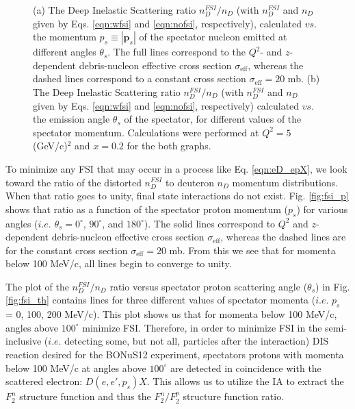 \begin{figure}
\begin{subfigure}[b]{0.4\linewidth}
	\end{subfigure}
	\caption[(a) The Deep Inelastic Scattering ratio $n_{D}^{FSI}/n_D$ calculated $vs.$ the momentum $p_s$ of the spectator nucleon emitted at different angles $\theta_s$. (b) The Deep Inelastic Scattering ratio $n_{D}^{FSI}/n_D$ calculated $vs.$ the emission angle $\theta_s$ of the spectator for different values of the spectator momentum.]{(a) The Deep Inelastic Scattering ratio $n_{D}^{FSI}/n_D$ (with $n_{D}^{FSI}$ and $n_D$ given by Eqs. \ref{eqn:wfsi} and \ref{eqn:nofsi}, respectively), calculated $vs.$ the momentum $p_s \equiv |\mathbf{p}_s|$ of the spectator nucleon emitted at different angles $\theta_s$. The full lines correspond to the $Q^2$- and $z$-dependent debris-nucleon effective cross section $\sigma_{\mathrm{eff}}$, whereas the dashed lines correspond to a constant cross section $\sigma_{\mathrm{eff}} = 20$ mb. (b) The Deep Inelastic Scattering ratio $n_{D}^{FSI}/n_D$ (with $n_{D}^{FSI}$ and $n_D$ given by Eqs. \ref{eqn:wfsi} and \ref{eqn:nofsi}, respectively) calculated $vs.$ the emission angle $\theta_s$ of the spectator, for different values of the spectator momentum. Calculations were performed at $Q^2 = 5$ (GeV/c)$^2$ and $x = 0.2$ for the both graphs.}
	\label{fig:fsi}
\end{figure}

To minimize any FSI that may occur in a process like Eq. \ref{eqn:eD_epX}, we look toward the ratio of the distorted $n_{D}^{FSI}$ to deuteron $n_{D}$ momentum distributions. When that ratio goes to unity, final state interactions do not exist. Fig. \ref{fig:fsi_p} shows that ratio as a function of the spectator proton momentum ($p_s$) for various angles ($i.e.$ $\theta_s = 0^{\circ}$, $90^{\circ}$, and $180^{\circ}$). The solid lines correspond to $Q^2$ and $z$-dependent debris-nucleon effective cross section $\sigma_{\mathrm{eff}}$, whereas the dashed lines are for the constant cross section $\sigma_{\mathrm{eff}} = 20$ mb. From this we see that for momenta below 100 MeV/c, all lines begin to converge to unity.

The plot of the $n_{D}^{FSI}/n_{D}$ ratio versus spectator proton scattering angle ($\theta_s$) in Fig. \ref{fig:fsi_th} contains lines for three different values of spectator momenta ($i.e.$ $p_s$ = 0, 100, 200 MeV/c). This plot shows us that for momenta below 100 MeV/c, angles above $100^{\circ}$ minimize FSI. Therefore, in order to minimize FSI in the semi-inclusive ($i.e.$ detecting some, but not all, particles after the interaction) DIS reaction desired for the BONuS12 experiment, spectators protons with momenta below 100 MeV/c at angles above $100^{\circ}$ are detected in coincidence with the scattered electron: $D(e,e',p_s)X$. This allows us to utilize the IA to extract the $F_2^n$ structure function and thus the $F_2^n/F_2^p$ structure function ratio.

